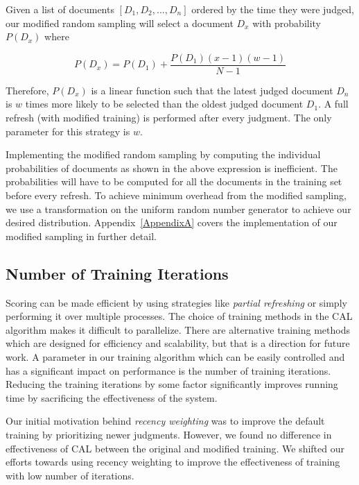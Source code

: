 Given a list of documents $[D_1, D_2, ..., D_n]$ ordered by the time
they were judged, our modified random sampling will
select a document $D_x$ with probability $P(D_x)$ where

\begin{equation*}
P(D_x) = P(D_1) + \frac{P(D_1)(x-1)(w-1)}{N-1}
\end{equation*}

Therefore, $P(D_x)$ is a linear function such that the latest judged document
$D_n$ is $w$ times more likely to be selected than the oldest judged document
$D_1$. A full refresh (with modified training) is performed after every
judgment. The only parameter for this strategy is $w$.

Implementing the modified random sampling by computing the individual
probabilities of documents as shown in the above expression is inefficient. The
probabilities will have to be computed for all the documents in the training set
before every refresh. To achieve minimum overhead from the modified sampling, we
use a transformation on the uniform random number generator to achieve our
desired distribution. Appendix~\ref{AppendixA} covers the implementation of our
modified sampling in further detail.

\subsection{Number of Training Iterations}
Scoring can be made efficient by using strategies like \textit{partial
refreshing} or simply performing it over multiple processes. The choice of
training methods in the CAL algorithm makes it difficult to parallelize. There are
alternative training methods which are designed for efficiency and scalability,
but that is a direction for future work. A parameter in our training algorithm
which can be easily controlled and has a significant impact on performance is
the number of training iterations. Reducing the training iterations by some
factor significantly improves running time by sacrificing the effectiveness
of the system.

Our initial motivation behind \textit{recency weighting} was to improve the
default training
by prioritizing newer judgments. However, we found no difference in
effectiveness of CAL between the original and modified training. We
shifted our efforts towards using recency weighting to improve the effectiveness
of training with low number of iterations.


